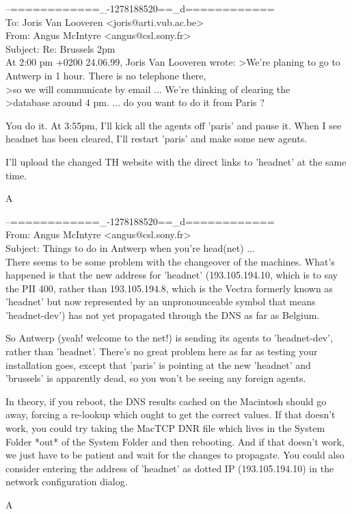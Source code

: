 \begin{mail} 
--============\_-1278188520==\_d============\\
To: Joris Van Looveren <joris@arti.vub.ac.be>\\
From: Angus McIntyre <angus@csl.sony.fr>\\
Subject: Re: Brussels 2pm\\

At 2:00 pm +0200 24.06.99, Joris Van Looveren wrote:
>We're planing to go to Antwerp in 1 hour. There is no telephone there,
\\>so we will communicate by email ... We're thinking of clearing the 
\\>database around 4 pm. ... do you want to do it from Paris ?

You do it. At 3:55pm, I'll kick all the agents off 'paris' and pause it. 
When I see headnet has been cleared, I'll restart 'paris' and make 
some new agents.

I'll upload the changed TH website with the direct links to 'headnet' 
at the same time.

		A
\end{mail}
\begin{mail}
--============\_-1278188520==\_d============\\
From: Angus McIntyre <angus@csl.sony.fr>\\
Subject: Things to do in Antwerp when you're head(net) ...\\

There seems to be some problem with the changeover of the machines. 
What's happened is that the new address for 'headnet' (193.105.194.10, 
which is to say the PII 400, rather than 193.105.194.8, which is 
the Vectra formerly known as 'headnet' but now 
represented by an unpronounceable symbol that means 'headnet-dev') has not 
yet propagated through the DNS as far as Belgium.

So Antwerp (yeah! welcome to the net!) is sending its agents to 'headnet-dev', 
rather than 'headnet'. There's no great problem here as far as testing your 
installation goes, except that 'paris' is pointing at the new 'headnet' and 
'brussels' is apparently dead, so you won't be seeing any foreign agents.

In theory, if you reboot, the DNS results cached on the Macintosh should go 
away, forcing a re-lookup which ought to get the correct values. If that 
doesn't work, you could try taking the MacTCP DNR file which lives in the 
System Folder *out* of the System Folder and then rebooting. And if that 
doesn't work, we just have to be patient and wait for the changes to propagate. 
You could also consider entering the address of 'headnet' as dotted IP 
(193.105.194.10) in the network configuration dialog.

	A \enlargethispage{1\baselineskip}
\end{mail}

